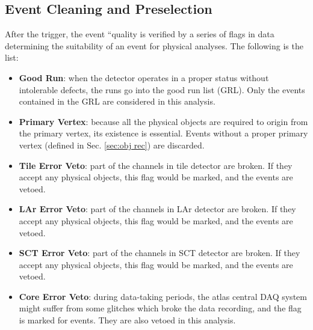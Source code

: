 \subsection{Event Cleaning and Preselection}
After the trigger, the event ``quality is verified by a series of flags in data determining the suitability of an event for physical analyses. The following is the list:
\begin{itemize}
	\item {\bf Good Run}: when the detector operates in a proper status without intolerable defects, the runs go into the good run list (GRL). Only the events contained in the GRL are considered in this analysis. 
	\item {\bf Primary Vertex}: because all the physical objects are required to origin from the primary vertex, its existence is essential. Events without a proper primary vertex (defined in Sec. \ref{sec:obj rec}) are discarded.
	\item {\bf Tile Error Veto}: part of the channels in tile detector are broken. If they accept any physical objects, this flag would be marked, and the events are vetoed.
	\item {\bf LAr Error Veto}: part of the channels in LAr detector are broken. If they accept any physical objects, this flag would be marked, and the events are vetoed.
	\item {\bf SCT Error Veto}: part of the channels in SCT detector are broken. If they accept any physical objects, this flag would be marked, and the events are vetoed.
	\item {\bf Core Error Veto}: during data-taking periods, the atlas central DAQ system might suffer from some glitches which broke the data recording, and the flag is marked for events. They are also vetoed in this analysis. 
\end{itemize}
